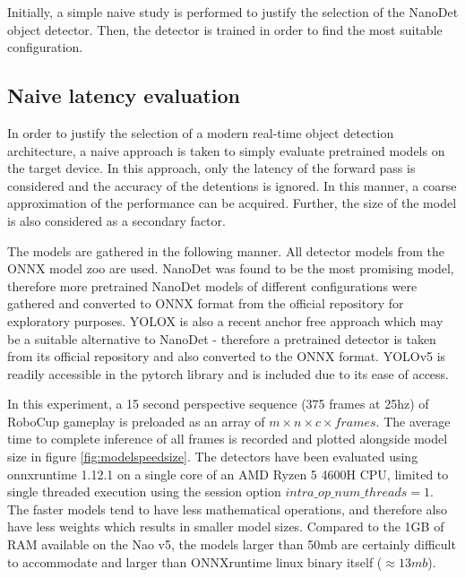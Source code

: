 \documentclass[a4paper,twoside,12pt]{report}
\begin{document}
Initially, a simple naive study is performed to justify the selection of the NanoDet object detector. Then, the detector is trained in order to find the most suitable configuration.

\subsection{Naive latency evaluation}
In order to justify the selection of a modern real-time object detection architecture, a naive approach is taken to simply evaluate pretrained models on the target device. In this approach, only the latency of the forward pass is considered and the accuracy of the detentions is ignored. In this manner, a coarse approximation of the performance can be acquired. Further, the size of the model is also considered as a secondary factor.

The models are gathered in the following manner. All detector models from the ONNX model zoo \cite{modelzoo} are used. NanoDet was found to be the most promising model, therefore more pretrained NanoDet models of different configurations were gathered and converted to ONNX format from the official repository for exploratory purposes. YOLOX \citep{yolox} is also a recent anchor free approach which may be a suitable alternative to NanoDet - therefore a pretrained detector is taken from its official repository \citep{yoloxrepo} and also converted to the ONNX format. YOLOv5 is readily accessible in the pytorch library and is included due to its ease of access. 

In this experiment, a 15 second perspective sequence (375 frames at 25hz) of RoboCup gameplay is preloaded as an array of $m \times n \times c \times frames$. The average time to complete inference of all frames is recorded and plotted alongside model size in figure \ref{fig:modelspeedsize}. The detectors have been evaluated using onnxruntime 1.12.1 on a single core of an AMD Ryzen 5 4600H CPU, limited to single threaded execution using the session option $intra\_op\_num\_threads = 1$. The faster models tend to have less mathematical operations, and therefore also have less weights which results in smaller model sizes. Compared to the 1GB of RAM available on the Nao v5, the models larger than 50mb are certainly difficult to accommodate and larger than ONNXruntime linux binary itself ($\approx13mb$).
\end{document}
